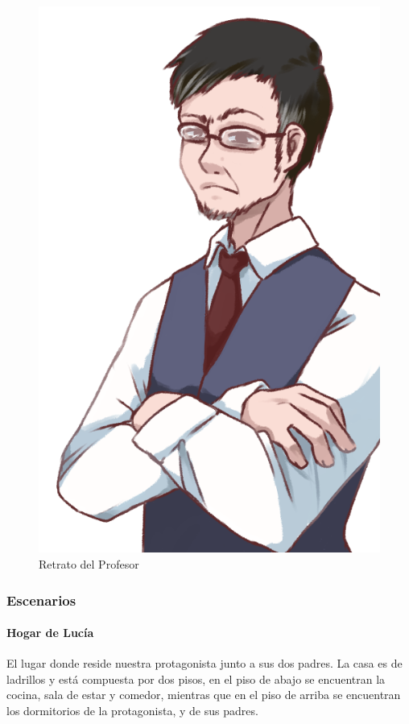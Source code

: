 \begin{figure}[h]
    \centering
    \includegraphics{imgs/profe.png}
    \caption{Retrato del Profesor}
    \label{fig:profesor}
\end{figure}




\subsubsection{Escenarios}
\paragraph{Hogar de Lucía}
El lugar donde reside nuestra protagonista junto a sus dos padres. La casa es de ladrillos y está compuesta por dos pisos, en el piso de abajo se encuentran la cocina, sala de estar y comedor, mientras que en el piso de arriba se encuentran los dormitorios de la protagonista, y de sus padres.

